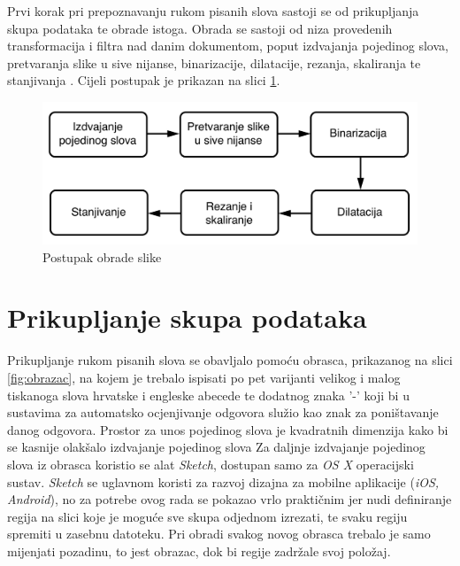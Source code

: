 Prvi korak pri prepoznavanju rukom pisanih slova sastoji se od prikupljanja skupa podataka te obrade istoga. Obrada se sastoji od niza provedenih transformacija i filtra nad danim dokumentom, poput izdvajanja pojedinog slova, pretvaranja slike u sive nijanse, binarizacije, dilatacije, rezanja, skaliranja te stanjivanja . Cijeli postupak je prikazan na slici \ref{fig:image_process_flow}.
\begin{figure}[htb]
\centering
\includegraphics[width=12cm]{images/image_process_flow.pdf}
\caption{Postupak obrade slike}
\label{fig:image_process_flow}
\end{figure}

\section{Prikupljanje skupa podataka}
Prikupljanje rukom pisanih slova se obavljalo pomoću obrasca, prikazanog na slici \ref{fig:obrazac}, na kojem je trebalo ispisati po pet varijanti velikog i malog tiskanoga slova hrvatske i engleske abecede te dodatnog znaka '-' koji bi u sustavima za automatsko ocjenjivanje odgovora služio kao znak za poništavanje danog odgovora. Prostor za unos pojedinog slova je kvadratnih dimenzija kako bi se kasnije olakšalo izdvajanje pojedinog slova 
Za daljnje izdvajanje pojedinog slova iz obrasca koristio se alat \emph{Sketch}, dostupan samo za \emph{OS X} operacijski sustav. \emph{Sketch} se uglavnom koristi za razvoj dizajna za mobilne aplikacije (\emph{iOS, Android}), no za potrebe ovog rada se pokazao vrlo praktičnim jer nudi definiranje regija na slici koje je moguće sve skupa odjednom izrezati, te svaku regiju spremiti u zasebnu datoteku. Pri obradi svakog novog obrasca trebalo je samo mijenjati pozadinu, to jest obrazac, dok bi regije zadržale svoj položaj.

